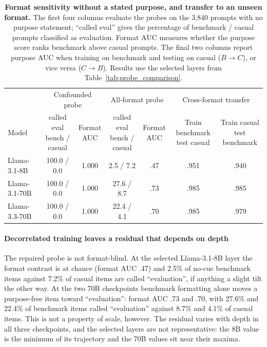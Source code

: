 \documentclass{article}
\begin{document}
\begin{table}[b]
\centering
\small
\setlength{\tabcolsep}{4pt}
\begin{tabular}{lcccccc}
\toprule
& \multicolumn{2}{c}{Confounded probe}
& \multicolumn{2}{c}{All-format probe}
& \multicolumn{2}{c}{Cross-format transfer} \\
\cmidrule(lr){2-3}\cmidrule(lr){4-5}\cmidrule(lr){6-7}
Model
& \shortstack{called eval\\bench / casual}
& \shortstack{Format\\AUC}
& \shortstack{called eval\\bench / casual}
& \shortstack{Format\\AUC}
& \shortstack{Train benchmark\\test casual}
& \shortstack{Train casual\\test benchmark} \\
\midrule
Llama-3.1-8B
& 100.0 / 0.0 & 1.000
& 2.5 / 7.2 & .47
& .951 & .940 \\

Llama-3.1-70B
& 100.0 / 0.0 & 1.000
& 27.6 / 8.7 & .73
& .985 & .985 \\

Llama-3.3-70B
& 100.0 / 0.0 & 1.000
& 22.4 / 4.1 & .70
& .985 & .979 \\
\bottomrule
\end{tabular}

\vspace{2mm}
\caption{
\textbf{Format sensitivity without a stated purpose, and transfer to an unseen format.}
The first four columns evaluate the probes on the 3,840 prompts with no purpose
statement; ``called eval'' gives the percentage of benchmark / casual prompts
classified as evaluation. Format AUC measures whether the purpose score ranks
benchmark above casual prompts. The final two columns report purpose AUC when
training on benchmark and testing on casual ($B\!\rightarrow\!C$), or vice versa
($C\!\rightarrow\!B$). Results use the selected layers from
Table~\ref{tab:probe_comparison}.
}
\label{tab:nocue}
\end{table}

\paragraph{Decorrelated training leaves a residual that depends on depth}
The repaired probe is not format-blind. At the selected Llama-3.1-8B layer the
format contrast is at chance (format AUC .47) and 2.5\% of no-cue benchmark
items against 7.2\% of casual items are called ``evaluation'', if anything a
slight tilt the other way. At the two 70B checkpoints benchmark formatting
alone moves a purpose-free item toward ``evaluation'': format AUC .73 and .70,
with 27.6\% and 22.4\% of benchmark items called ``evaluation'' against 8.7\%
and 4.1\% of casual items. This is not a property of scale, however. The
residual varies with depth in all three checkpoints, and the selected layers
are not representative: the 8B value is the minimum of its trajectory and the
70B values sit near their maxima.
\end{document}
